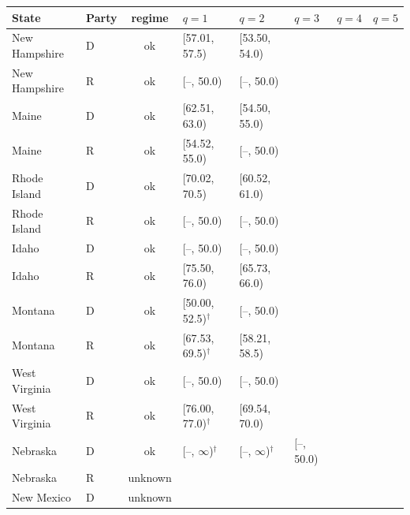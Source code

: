 \begin{tabular}{llclllll}
\toprule
State & Party & regime & $q=1$ & $q=2$ & $q=3$ & $q=4$ & $q=5$ \\
\midrule
New Hampshire & D & ok & [57.01, 57.5) & [53.50, 54.0) &  &  &  \\
New Hampshire & R & ok & [--, 50.0) & [--, 50.0) &  &  &  \\
Maine & D & ok & [62.51, 63.0) & [54.50, 55.0) &  &  &  \\
Maine & R & ok & [54.52, 55.0) & [--, 50.0) &  &  &  \\
Rhode Island & D & ok & [70.02, 70.5) & [60.52, 61.0) &  &  &  \\
Rhode Island & R & ok & [--, 50.0) & [--, 50.0) &  &  &  \\
Idaho & D & ok & [--, 50.0) & [--, 50.0) &  &  &  \\
Idaho & R & ok & [75.50, 76.0) & [65.73, 66.0) &  &  &  \\
Montana & D & ok & [50.00, 52.5)$^\dagger$ & [--, 50.0) &  &  &  \\
Montana & R & ok & [67.53, 69.5)$^\dagger$ & [58.21, 58.5) &  &  &  \\
West Virginia & D & ok & [--, 50.0) & [--, 50.0) &  &  &  \\
West Virginia & R & ok & [76.00, 77.0)$^\dagger$ & [69.54, 70.0) &  &  &  \\
Nebraska & D & ok & [--, $\infty$)$^\dagger$ & [--, $\infty$)$^\dagger$ & [--, 50.0) &  &  \\
Nebraska & R & unknown &  &  &  &  &  \\
New Mexico & D & unknown &  &  &  &  &  \\
\bottomrule
\end{tabular}
